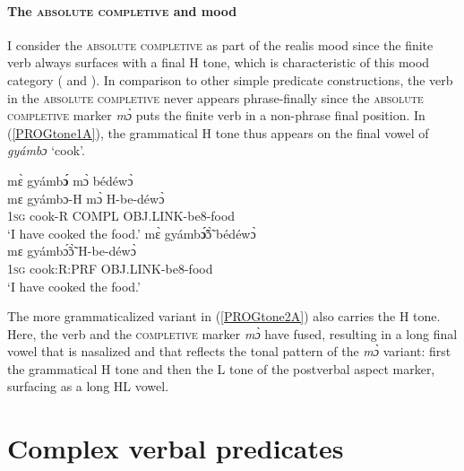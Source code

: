 \paragraph{The \textsc{absolute completive} and mood}
I consider the \textsc{absolute completive} as part of the realis mood since the finite verb always surfaces with a final H tone, which is characteristic of this mood category ( and ). In comparison to other simple predicate constructions, the verb in the \textsc{absolute completive} never appears phrase-finally since the \textsc{absolute completive} marker {\itshape mɔ̀} puts the finite verb in a non-phrase final position.  In (\ref{PROGtone1A}), the grammatical H tone thus appears on the final vowel of {\itshape gyámbɔ} `cook'. 

\begin{exe}
\ex\label{PROGtoneA}
\begin{xlist}
\ex\label{PROGtone1A}
  \glll     mɛ̀ gyámb{\bfseries ɔ́} mɔ̀ bédéwɔ̀ \\
           mɛ gyámbɔ-H mɔ̀ H-be-déwɔ̀ \\
            1\textsc{sg} cook-R COMPL OBJ.LINK-be8-food  \\
    \trans `I have cooked the food.'
\ex \label{PROGtone2A}
  \glll  mɛ̀ gyámb{\bfseries ɔ̃́}ɔ̃̀ bédéwɔ̀ \\
            mɛ gyámbɔ̃́ɔ̃̀ H-be-déwɔ̀ \\
             1\textsc{sg} cook:R:PRF OBJ.LINK-be8-food  \\
    \trans `I have cooked the food.'
\end{xlist}
\end{exe}

\noindent The more grammaticalized variant in (\ref{PROGtone2A}) also carries the H tone. Here, the verb and the \textsc{completive} marker {\itshape mɔ̀} have fused, resulting in a  long final vowel that is nasalized and that reflects the tonal pattern of the {\itshape mɔ̀} variant: first the grammatical H tone and then the L tone of the postverbal aspect marker, surfacing as a long HL vowel.
















\section{Complex verbal predicates}
\label{sec:CompPred}

